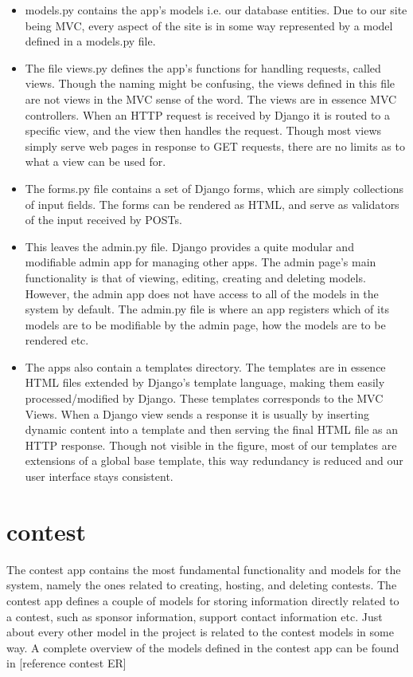\begin{itemize}
\item models.py contains the app's models i.e. our database entities. Due
to our site being MVC, every aspect of the site is in some way
represented by a model defined in a models.py file.

\item The file views.py defines the app{\textquoteright}s functions for
handling requests, called views. Though the naming might be confusing,
the views defined in this file are not views in the MVC sense of the
word. The views are in essence MVC controllers. When an HTTP request is
received by Django it is routed to a specific view, and the view then
handles the request. Though most views simply serve web pages in
response to GET requests, there are no limits as to what a view can be
used for. 
\item The forms.py file contains a set of Django forms, which are simply
collections of input fields. The forms can be rendered as HTML, and
serve as validators of the input received by POSTs. 

\item This leaves the admin.py file. Django provides a quite modular and
modifiable admin app for managing other apps. The admin
page{\textquoteright}s main functionality is that of viewing, editing,
creating and deleting models. However, the admin app does not have
access to all of the models in the system by default. The admin.py file
is where an app registers which of its models are to be modifiable by
the admin page, how the models are to be rendered etc.

\item The apps also contain a templates directory. The templates are in
essence HTML files extended by Django's template language, making them
easily processed/modified by Django. These templates corresponds to the MVC Views.
When a Django view sends a response it is usually by inserting dynamic
content into a template and then serving the final HTML file as
an HTTP response. Though not visible in the figure, most of our
templates are extensions of a global base template, this way redundancy
is reduced and our user interface stays consistent.
\end{itemize}

\bigskip

\section{contest}
The contest app contains the most fundamental functionality and models for the system,
namely the ones related to creating, hosting, and deleting contests. 
The contest app defines a couple of models
for storing information directly related to a contest, such as sponsor
information, support contact information etc. Just about every
other model in the project is related to the contest models in some way.
A complete overview of the models defined in the contest app can be
found in [reference contest ER]


